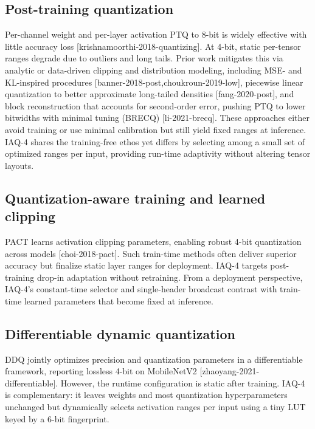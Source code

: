 \documentclass{article}
\begin{document}
\subsection{Post-training quantization}
Per-channel weight and per-layer activation PTQ to 8-bit is widely effective with little accuracy loss [krishnamoorthi-2018-quantizing]. At 4-bit, static per-tensor ranges degrade due to outliers and long tails. Prior work mitigates this via analytic or data-driven clipping and distribution modeling, including MSE- and KL-inspired procedures [banner-2018-post,choukroun-2019-low], piecewise linear quantization to better approximate long-tailed densities [fang-2020-post], and block reconstruction that accounts for second-order error, pushing PTQ to lower bitwidths with minimal tuning (BRECQ) [li-2021-brecq]. These approaches either avoid training or use minimal calibration but still yield fixed ranges at inference. IAQ-4 shares the training-free ethos yet differs by selecting among a small set of optimized ranges per input, providing run-time adaptivity without altering tensor layouts.

\subsection{Quantization-aware training and learned clipping}
PACT learns activation clipping parameters, enabling robust 4-bit quantization across models [choi-2018-pact]. Such train-time methods often deliver superior accuracy but finalize static layer ranges for deployment. IAQ-4 targets post-training drop-in adaptation without retraining. From a deployment perspective, IAQ-4's constant-time selector and single-header broadcast contrast with train-time learned parameters that become fixed at inference.

\subsection{Differentiable dynamic quantization}
DDQ jointly optimizes precision and quantization parameters in a differentiable framework, reporting lossless 4-bit on MobileNetV2 [zhaoyang-2021-differentiable]. However, the runtime configuration is static after training. IAQ-4 is complementary: it leaves weights and most quantization hyperparameters unchanged but dynamically selects activation ranges per input using a tiny LUT keyed by a 6-bit fingerprint.
\end{document}
